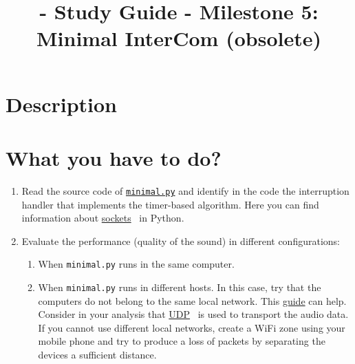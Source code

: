 
\title{\TM{} - Study Guide - Milestone 5: Minimal InterCom (obsolete)}

\maketitle

\section{Description}


\section{What you have to do?}

\begin{enumerate}

\item Read the source code of
  \href{https://github.com/Tecnologias-multimedia/intercom/blob/master/src/minimal.py}{\texttt{minimal.py}}
  and identify in the code the interruption handler that implements
  the timer-based algorithm. Here you can find information about
  \href{https://github.com/vicente-gonzalez-ruiz/YAPT/blob/master/03-IO/networking/sockets.ipynb}{sockets}~\cite{YAPT} in Python.
  
\item Evaluate the performance (quality of the sound) in different configurations:
  \begin{enumerate}
  \item When \verb|minimal.py| runs in the same computer.
  \item When \verb|minimal.py| runs in different hosts. In this case,
    try that the computers do not belong to the same local
    network. This
    \href{https://www.noip.com/support/knowledgebase/general-port-forwarding-guide/}{guide}
    can help. Consider in your analysis that
    \href{https://en.wikipedia.org/wiki/User_Datagram_Protocol}{UDP}~\cite{UDP}
    is used to transport the audio data. If you cannot use different
    local networks, create a WiFi zone using your mobile phone and try
    to produce a loss of packets by separating the devices a
    sufficient distance.
  \end{enumerate}
   
  
\end{enumerate}

